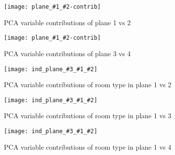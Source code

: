 \newcommand{\contrib}[2]{
    \begin{figure}[H]
        \centering
        \texttt{[image: plane\_\#1\_\#2-contrib]}
        \caption{PCA variable contributions of plane #1 vs #2}%
        \label{fig:contrib_plane_#1-#2}
    \end{figure}
}

\newcommand{\categorica}[4]{
    \begin{figure}[H]
        \centering
        \texttt{[image: ind\_plane\_\#3\_\#1\_\#2]}
        \caption{PCA variable contributions of #4 in plane #1 vs #2}%
        \label{fig:cat-#3-plane-#1-#2}
    \end{figure}
}

\begin{landscape}



\contrib{1}{2}
\contrib{3}{4}

\categorica{1}{2}{room_type}{room type}
\categorica{1}{3}{room_type}{room type}
\categorica{1}{4}{room_type}{room type}

\end{landscape}







